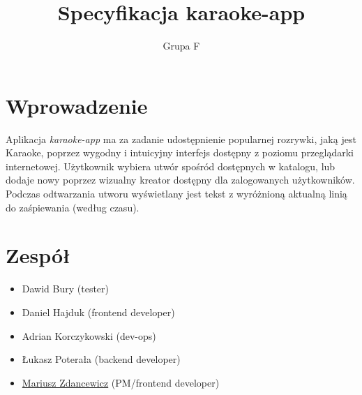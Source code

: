 \documentclass[11pt]{article}
\title{Specyfikacja karaoke-app}
\author{Grupa F}
\begin{document}
  \maketitle

  \section{Wprowadzenie}
  Aplikacja \textit{karaoke-app} ma za zadanie udostępnienie popularnej rozrywki, jaką jest Karaoke, poprzez wygodny i intuicyjny interfejs dostępny z poziomu przeglądarki internetowej. Użytkownik wybiera utwór spośród dostępnych w katalogu, lub dodaje nowy poprzez wizualny kreator dostępny dla zalogowanych użytkowników. Podczas odtwarzania utworu wyświetlany jest tekst z wyróżnioną aktualną linią do zaśpiewania (według czasu).

  \section{Zespół}
  \begin{itemize}
    \item Dawid Bury (tester)   
    \item Daniel Hajduk (frontend developer)
    \item Adrian Korczykowski (dev-ops)
    \item Łukasz Poterała (backend developer)
    \item \underline{Mariusz Zdancewicz} (PM/frontend developer)
  \end{itemize}
\end{document}
